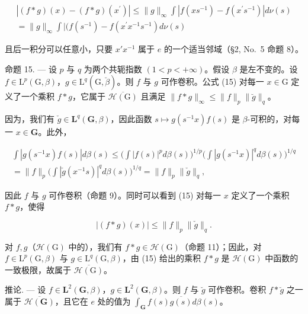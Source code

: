 \[
\begin{array}{c} | (f * g) (x) - (f * g) (x ^ {\prime}) | \leqslant \| g \| _ {\infty} \int | f (x s ^ {- 1}) - f (x ^ {\prime} s ^ {- 1}) | d \nu (s) \\ = \| g \| _ {\infty} \int | (f (s ^ {- 1}) - f (x ^ {\prime} x ^ {- 1} s ^ {- 1}) d \nu (s) \end{array}
\]

且后一积分可以任意小，只要 \(x'x^{-1}\) 属于 \(e\) 的一个适当邻域（§2, No.~5 命题 8）。

命题 15. --- 设 \(p\) 与 \(q\) 为两个共轭指数 \((1 < p < +\infty)\)。假设 \(\beta\) 是左不变的。设 \(f \in \mathrm{L}^p(\mathrm{G}, \beta)\)，\(g \in \mathrm{L}^q(\mathrm{G}, \breve{\beta})\)。则 \(f\) 与 \(g\) 可作卷积。公式 (15) 对每一 \(x \in \mathrm{G}\) 定义了一个乘积 \(f * g\)，它属于 \(\overline{\mathcal{H}(\mathrm{G})}\) 且满足 \(\| f * g \|_{\infty} \leqslant \| f \|_p \| \breve{g} \|_q\)。

因为，我们有 \(\check{g} \in \mathbf{L}^q(\mathbf{G}, \beta)\)，因此函数 \(s \mapsto g(s^{-1}x)f(s)\) 是 \(\beta\)-可积的，对每一 \(x \in \mathbf{G}\)。此外，

\[
\begin{array}{c} \int | g (s ^ {- 1} x) f (s) | d \beta (s) \leqslant \bigg (\int | f (s) | ^ {p} d \beta (s) \bigg) ^ {1 / p} \bigg (\int | g (s ^ {- 1} x) | ^ {q} d \beta (s) \bigg) ^ {1 / q} \\ = \| f \| _ {p} \bigg (\int | \check {g} (x ^ {- 1} s) | ^ {q} d \beta (s) \bigg) ^ {1 / q} = \| f \| _ {p} \| \check {g} \| _ {q}, \end{array}
\]

因此 \(f\) 与 \(g\) 可作卷积（命题 9）。同时可以看到 (15) 对每一 \(x\) 定义了一个乘积 \(f * g\)，使得

\[
\left| (f * g) (x) \right| \leqslant \| f \| _ {p} \| \check {g} \| _ {q}.
\]

对 \(f, g\)（\(\mathcal{H}(\mathrm{G})\) 中的），我们有 \(f * g \in \mathcal{H}(\mathrm{G})\)（命题 11）；因此，对 \(f \in \mathrm{L}^p(\mathrm{G}, \beta)\) 与 \(g \in \mathrm{L}^q(\mathrm{G}, \beta)\)，由 (15) 给出的乘积 \(f * g\) 是 \(\mathcal{H}(\mathrm{G})\) 中函数的一致极限，故属于 \(\overline{\mathcal{H}(\mathrm{G})}\)。

推论. --- 设 \(f \in \mathbf{L}^2(\mathbf{G}, \beta)\)，\(g \in \mathbf{L}^2(\mathbf{G}, \beta)\)。则 \(f\) 与 \(\breve{g}\) 可作卷积。卷积 \(f * \breve{g}\) 之一属于 \(\overline{\mathcal{H}(\mathbf{G})}\)，且它在 \(e\) 处的值为 \(\int_{\mathbf{G}} f(s) \overline{g(s)} d\beta(s)\)。

